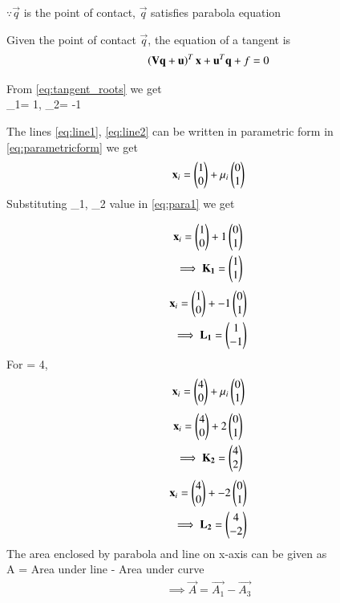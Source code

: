 \documentclass[journal,12pt,twocolumn]{IEEEtran}
\begin{document}
$\because \vec{q}$ is the point of contact, $\vec{q}$ satisfies parabola equation

\item 
Given the point of contact $\vec{q}$, the equation of a tangent is 
\begin{align}
\left(\mathbf{V}\mathbf{q}+\mathbf{u}\right)^T\mathbf{x}+\mathbf{u}^T\mathbf{q}+f = 0
\label{eq:conic_tangent_final}
\end{align}

From \eqref{eq:tangent_roots} we get \\
\mu_1= 1, \mu_2= -1

The lines \eqref{eq:line1}, \eqref{eq:line2} can be written in parametric form in \eqref{eq:parametricform} we get\\
\begin{align}\label{eq:para1}
\mathbf{x}_i = \begin{pmatrix} 1\\ 0\end{pmatrix} + \mu_i \begin{pmatrix}0\\1\end{pmatrix}
\end{align}
Substituting \mu_1, \mu_2 value in \eqref{eq:para1} we get

\begin{align}
\mathbf{x}_i = \begin{pmatrix}1\\0\end{pmatrix} + 1\begin{pmatrix}0\\1\end{pmatrix}\\
\implies\mathbf{K_1}=\begin{pmatrix}1\\1\end{pmatrix}
\end{align}
\begin{align}
\mathbf{x}_i = \begin{pmatrix}1\\0\end{pmatrix} + -1\begin{pmatrix}0\\1\end{pmatrix}\\
\implies\mathbf{L_1}=\begin{pmatrix}1\\-1\end{pmatrix}
\end{align}
For = 4, 
\begin{align}\label{eq:para2}
\mathbf{x}_i = \begin{pmatrix} 4\\ 0\end{pmatrix} + \mu_i \begin{pmatrix}0\\1\end{pmatrix}
\end{align}
\begin{align}
\mathbf{x}_i = \begin{pmatrix}4\\0\end{pmatrix} + 2\begin{pmatrix}0\\1\end{pmatrix}\\
\implies\mathbf{K_2}=\begin{pmatrix}4\\2\end{pmatrix}
\end{align}
\begin{align}
\mathbf{x}_i = \begin{pmatrix}4\\0\end{pmatrix} + -2\begin{pmatrix}0\\1\end{pmatrix}\\
\implies\mathbf{L_2}=\begin{pmatrix}4\\-2\end{pmatrix}
\end{align}
The area enclosed by parabola and line on x-axis can be given as\\
A = Area under line - Area under curve
\begin{align}
\implies\boxed{\vec{A} = \vec{A_1}-\vec{A_3}} \label{eq:A}
\end{align}
  
\end{document}
